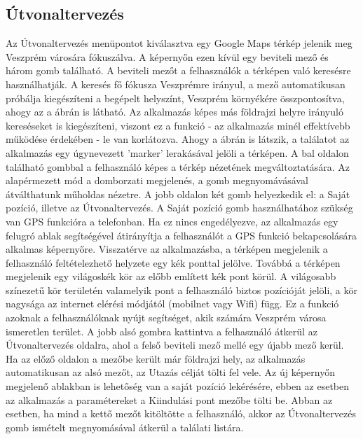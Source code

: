 \subsection {Útvonaltervezés}
\label {utvonalterv}
Az Útvonaltervezés menüpontot kiválasztva egy Google Maps térkép jelenik meg Veszprém városára fókuszálva.
A képernyőn ezen kívül egy beviteli mező és három gomb található.
A beviteli mezőt a felhasználók a térképen való keresésre használhatják.
A keresés fő fókusza Veszprémre irányul, a mező automatikusan próbálja kiegészíteni a begépelt helyszínt, Veszprém környékére összpontosítva, ahogy az a  ábrán is látható.
Az alkalmazás képes más földrajzi helyre irányuló kereséseket is kiegészíteni, viszont ez a funkció - az alkalmazás minél effektívebb működése érdekében - le van korlátozva.
Ahogy a  ábrán is látszik, a találatot az alkalmazás egy úgynevezett 'marker' lerakásával jelöli a térképen.
A bal oldalon található gombbal a felhasználó képes a térkép nézetének megváltoztatására.
Az alapérmezett mód a domborzati megjelenés, a gomb megnyomávásával átválthatunk műholdas nézetre.
A jobb oldalon két gomb helyezkedik el: a Saját pozíció, illetve az Útvonaltervezés.
A Saját pozíció gomb használhatához szükség van GPS funkcióra a telefonban.
Ha ez nincs engedélyezve, az alkalmazás egy felugró ablak segítségével átirányítja a felhasználót a GPS funkció bekapcsolására alkalmas képernyőre.
Visszatérve az alkalmazásba, a térképen megjelenik a felhasználó feltételezhető helyzete egy kék ponttal jelölve.
Továbbá a térképen megjelenik egy világoskék kör az előbb említett kék pont körül.
A világosabb színezetű kör területén valamelyik pont a felhasználó biztos pozícióját jelöli, a kör nagysága az internet elérési módjától (mobilnet vagy Wifi) függ.
Ez a funkció azoknak a felhasználóknak nyújt segítséget, akik számára Veszprém városa ismeretlen terület.
A jobb alsó gombra kattintva a felhasználó átkerül az Útvonaltervezés oldalra, ahol a felső beviteli mező mellé egy újabb mező kerül.
Ha az előző oldalon a mezőbe került már földrajzi hely, az alkalmazás automatikusan az alsó mezőt, az Utazás célját tölti fel vele.
Az új képernyőn megjelenő ablakban is lehetőség van a saját pozíció lekérésére, ebben az esetben az alkalmazás a paramétereket a Kiindulási pont mezőbe tölti be.
Abban az esetben, ha mind a kettő mezőt kitöltötte a felhasználó, akkor az Útvonaltervezés gomb ismételt megnyomásával átkerül a találati listára.
